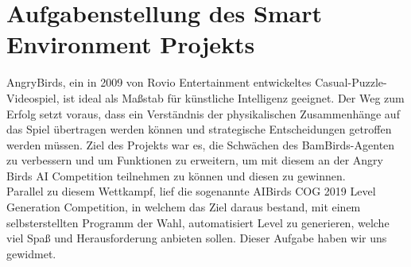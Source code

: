 \section{Aufgabenstellung des Smart Environment Projekts}
AngryBirds, ein in 2009 von Rovio Entertainment entwickeltes Casual-Puzzle-Videospiel, ist ideal als Maßstab für künstliche Intelligenz geeignet. Der Weg zum Erfolg setzt voraus, dass ein Verständnis der physikalischen Zusammenhänge auf das Spiel übertragen werden können und strategische Entscheidungen getroffen werden müssen. Ziel des Projekts war es, die Schwächen des BamBirds-Agenten zu verbessern und um Funktionen zu erweitern, um mit diesem an der Angry Birds AI Competition teilnehmen zu können und diesen zu gewinnen.\\Parallel zu diesem Wettkampf, lief die sogenannte AIBirds COG 2019 Level Generation Competition, in welchem das Ziel daraus bestand, mit einem selbsterstellten Programm der Wahl, automatisiert Level zu generieren, welche viel Spaß und Herausforderung anbieten sollen. Dieser Aufgabe haben wir uns gewidmet.